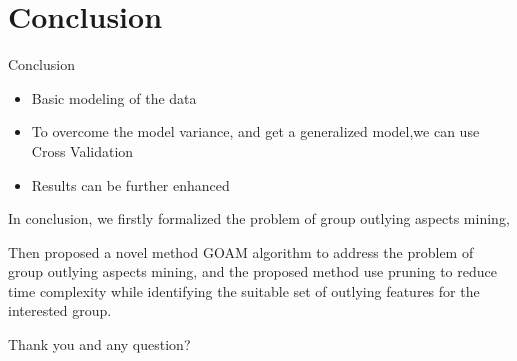 \documentclass[
 size=14pt,
 paper=smartboard,  %
 mode=present, 		%
 display=slides, 	%
 style=tuliplab,  	%
 pauseslide,
 fleqn,leqno]{powerdot}
\begin{document}


\section{Conclusion}

\begin{slide}[toc=,bm=]{Conclusion}
\begin{itemize}
\item
\smallskip
Basic modeling of the data

\item
\smallskip
To overcome the model variance, and get a generalized model,we can use Cross Validation

\item
\smallskip
Results can be further enhanced

\end{itemize}

\begin{note}
In conclusion,
we firstly formalized the problem of
group outlying aspects mining,

Then proposed a novel method GOAM algorithm to address the problem of
group outlying aspects mining,
and the proposed method use pruning to reduce time complexity
while identifying the suitable set of outlying features for the interested group.

Thank you and any question?
\end{note}

\end{slide}


%
\end{document}
